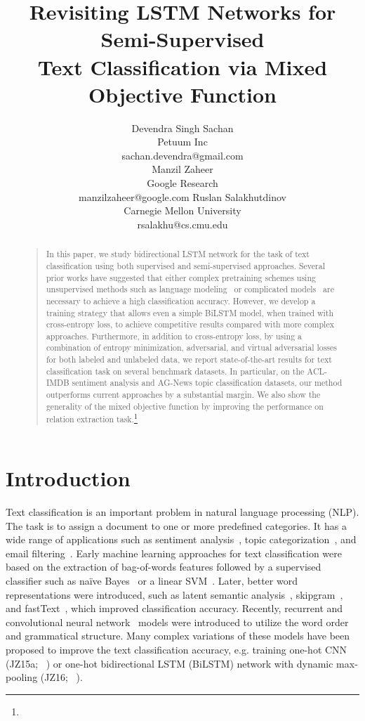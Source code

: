 \documentclass[letterpaper]{article}
\title{Revisiting LSTM Networks for Semi-Supervised \\Text Classification via Mixed Objective Function}
\author{Devendra Singh Sachan\\
Petuum Inc\\
{sachan.devendra@gmail.com}\\
\And
Manzil Zaheer\\
Google Research\\
{manzilzaheer@google.com}
\And 
Ruslan Salakhutdinov\\
Carnegie Mellon University\\
{rsalakhu@cs.cmu.edu}
}
\newcommand{\citep}{\cite}
\newcommand{\citealp}[1]{\citeauthor{#1} \citeyear{#1}}
\begin{document}
\maketitle

\begin{abstract}
\begin{quote}
    In this paper, we study bidirectional LSTM network for the task of text classification using both supervised and semi-supervised approaches. Several prior works have suggested that either complex pretraining schemes using unsupervised methods such as language modeling~\citep{dai2015semi,miyato2016adversarial} or complicated models~\citep{johnson2017deep} are necessary to achieve a high classification accuracy. However, we develop a training strategy that allows even a simple BiLSTM model, when trained with cross-entropy loss, to achieve competitive results compared with more complex approaches. Furthermore, in addition to cross-entropy loss, by using a combination of entropy minimization, adversarial, and virtual adversarial losses for both labeled and unlabeled data, we report state-of-the-art results for text classification task on several benchmark datasets. In particular, on the ACL-IMDB sentiment analysis and AG-News topic classification datasets, our method outperforms current approaches by a substantial margin. We also show the generality of the mixed objective function by improving the performance on relation extraction task.\footnote{\mycodeurl}
\end{quote}
\end{abstract}

\section{Introduction}
Text classification is an important problem in natural language processing (NLP). The task is to assign a document to one or more predefined categories. It has a wide range of applications such as sentiment analysis~\citep{pang2008opinion}, topic categorization~\citep{lewis2004rcv1}, and email filtering~\citep{sahami98bayesian}. Early machine learning approaches for text classification were based on the extraction of bag-of-words features followed by a supervised classifier such as na\"ive Bayes~\citep{mccallum1998comparison} or a linear SVM~\citep{joachims1998text}. Later, better word representations were introduced, such as latent semantic analysis~\citep{Deerwester90indexingby}, skipgram~\citep{mikolov2013distributed}, and fastText~\citep{joulin2017fastText}, which improved classification accuracy. Recently, recurrent and convolutional neural network~\citep{kim2014convolutional} models were introduced to utilize the word order and grammatical structure. Many complex variations of these models have been proposed to improve the text classification accuracy, e.g. training one-hot CNN (JZ15a;~\citealp{johnson2015effective}) or one-hot bidirectional LSTM (BiLSTM) network with dynamic max-pooling (JZ16;~\citealp{johnson2016supervised}).
\end{document}
